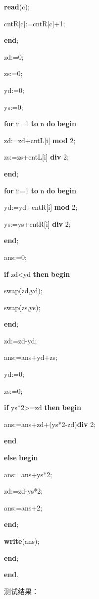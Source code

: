 \documentclass[]{ctexart}
\newenvironment{Shaded}{}{}
\newcommand{\DecValTok}[1]{\textcolor[rgb]{0.25,0.63,0.44}{#1}}
\newcommand{\KeywordTok}[1]{\textcolor[rgb]{0.00,0.44,0.13}{\textbf{#1}}}
\newcommand{\NormalTok}[1]{#1}
\begin{document}
\begin{Shaded}
\begin{Highlighting}[]
            \KeywordTok{read}\NormalTok{(c);
}
\NormalTok{            cntR[c]:=cntR[c]+}\DecValTok{1}\NormalTok{;
}
        \KeywordTok{end}\NormalTok{;
}
\NormalTok{        zd:=}\DecValTok{0}\NormalTok{;
}
\NormalTok{        zs:=}\DecValTok{0}\NormalTok{;
}
\NormalTok{        yd:=}\DecValTok{0}\NormalTok{;
}
\NormalTok{        ys:=}\DecValTok{0}\NormalTok{;
}
        \KeywordTok{for}\NormalTok{ i:=}\DecValTok{1} \KeywordTok{to}\NormalTok{ n }\KeywordTok{do} \KeywordTok{begin}

\NormalTok{            zd:=zd+cntL[i] }\KeywordTok{mod} \DecValTok{2}\NormalTok{;
}
\NormalTok{            zs:=zs+cntL[i] }\KeywordTok{div} \DecValTok{2}\NormalTok{;
}
        \KeywordTok{end}\NormalTok{;
}
        \KeywordTok{for}\NormalTok{ i:=}\DecValTok{1} \KeywordTok{to}\NormalTok{ n }\KeywordTok{do} \KeywordTok{begin}

\NormalTok{            yd:=yd+cntR[i] }\KeywordTok{mod} \DecValTok{2}\NormalTok{;
}
\NormalTok{            ys:=ys+cntR[i] }\KeywordTok{div} \DecValTok{2}\NormalTok{;
}
        \KeywordTok{end}\NormalTok{;
}
\NormalTok{        ans:=}\DecValTok{0}\NormalTok{;
}
        \KeywordTok{if}\NormalTok{ zd<yd }\KeywordTok{then} \KeywordTok{begin}

\NormalTok{            swap(zd,yd);
}
\NormalTok{            swap(zs,ys);
}
        \KeywordTok{end}\NormalTok{;
}
\NormalTok{        zd:=zd-yd;
}
\NormalTok{        ans:=ans+yd+zs;
}
\NormalTok{        yd:=}\DecValTok{0}\NormalTok{;
}
\NormalTok{        zs:=}\DecValTok{0}\NormalTok{;
}
        \KeywordTok{if}\NormalTok{ ys*}\DecValTok{2}\NormalTok{>=zd }\KeywordTok{then} \KeywordTok{begin}

\NormalTok{            ans:=ans+zd+(ys*}\DecValTok{2}\NormalTok{-zd)}\KeywordTok{div} \DecValTok{2}\NormalTok{;
}
        \KeywordTok{end}

        \KeywordTok{else} \KeywordTok{begin}

\NormalTok{            ans:=ans+ys*}\DecValTok{2}\NormalTok{;
}
\NormalTok{            zd:=zd-ys*}\DecValTok{2}\NormalTok{;
}
\NormalTok{            ans:=ans+}\DecValTok{2}\NormalTok{;
}
        \KeywordTok{end}\NormalTok{;
}
        \KeywordTok{write}\NormalTok{(ans);
}
    \KeywordTok{end}\NormalTok{;
}


 \KeywordTok{end}\NormalTok{.}
\end{Highlighting}
\end{Shaded}

测试结果：
\end{document}
